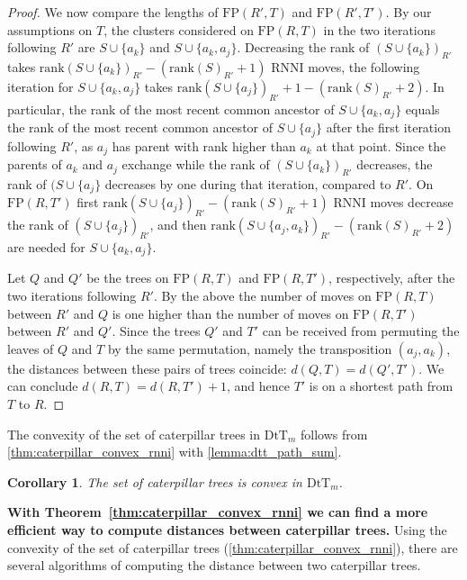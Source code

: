 \documentclass[11pt]{amsart}
\newtheorem{corollary}{Corollary}
\newcommand{\rnni}{\mathrm{RNNI}}
\newcommand{\rank}{\mathrm{rank}}
\newcommand{\fp}{\mathrm{FP}}
\newcommand{\dtt}{\mathrm{DtT}}
\newcommand{\summary}[1]{\textbf{#1}} %
\begin{document}
\begin{proof}
	We now compare the lengths of $\fp(R',T)$ and $\fp(R',T')$.
	By our assumptions on $T$, the clusters considered on $\fp(R,T)$ in the two iterations following $R'$ are $S \cup \{a_k\}$ and $S \cup \{a_k, a_j\}$.
	Decreasing the rank of $(S \cup \{a_k\})_{R'}$ takes $\rank(S \cup \{a_k\})_{R'} - (\rank(S)_{R'} + 1)$ $\rnni$ moves, the following iteration for $S \cup \{a_k, a_j\}$ takes $\rank(S \cup \{a_j\})_{R'} + 1 - (\rank(S)_{R'} + 2)$.
	In particular, the rank of the most recent common ancestor of $S \cup \{a_k, a_j\}$ equals the rank of the most recent common ancestor of $S \cup \{a_j\}$ after the first iteration following $R'$, as $a_j$ has parent with rank higher than $a_k$ at that point.
	Since the parents of $a_k$ and $a_j$ exchange while the rank of $(S \cup \{a_k\})_{R'}$ decreases, the rank of $(S \cup \{a_j\}$ decreases by one during that iteration, compared to $R'$.
	On $\fp(R,T')$ first $\rank(S \cup \{a_j\})_{R'} - (\rank(S)_{R'} + 1)$ $\rnni$ moves decrease the rank of $(S \cup \{a_j\})_{R'}$, and then $\rank(S \cup \{a_j, a_k\})_{R'} - (\rank(S)_{R'} + 2)$ are needed for $S \cup \{a_k, a_j\}$.

	Let $Q$ and $Q'$ be the trees on $\fp(R,T)$ and $\fp(R,T')$, respectively, after the two iterations following $R'$.
	By the above the number of moves on $\fp(R,T)$ between $R'$ and $Q$ is one higher than the number of moves on $\fp(R,T')$ between $R'$ and $Q'$.
	Since the trees $Q'$ and $T'$ can be received from permuting the leaves of $Q$ and $T$ by the same permutation, namely the transposition $(a_j, a_k)$, the distances between these pairs of trees coincide: $d(Q,T) = d(Q',T')$.
	We can conclude $d(R,T) = d(R,T') + 1$, and hence $T'$ is on a shortest path from $T$ to $R$.
\end{proof}

The convexity of the set of caterpillar trees in $\dtt_m$ follows from \autoref{thm:caterpillar_convex_rnni} with \autoref{lemma:dtt_path_sum}.

\begin{corollary}
	The set of caterpillar trees is convex in $\dtt_m$.
	\label{cor:caterpillar_convex_dtt}
\end{corollary}

\summary{With Theorem~\ref{thm:caterpillar_convex_rnni} we can find a more efficient way to compute distances between caterpillar trees.}
Using the convexity of the set of caterpillar trees (\autoref{thm:caterpillar_convex_rnni}), there are several algorithms of computing the distance between two caterpillar trees.
\end{document}
